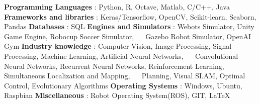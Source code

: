 \begin{cventries}  
\skillentry
    {
    \bullet \space \textbf{Programming Languages} : Python, R, Octave, Matlab, C/C++, Java \newline
    \bullet \space \textbf{Frameworks and libraries} : Keras/Tensorflow, OpenCV, Scikit-learn, Seaborn, Pandas   \newline
    \bullet \space \textbf{Databases} : SQL
    \bullet \space \textbf{Engines and Simulators} : Webots Simulator, Unity Game Engine, Robocup Soccer Simulator, \newline $\quad$ Gazebo Robot Simulator, OpenAI Gym \newline
    \bullet \space \textbf{Industry knowledge} : Computer Vision, Image Processing, Signal Processing, Machine Learning, Artificial Neural Networks, \newline $\quad$ Convolutional Neural Networks, Recurrent Neural Networks, Reinforcement Learning, Simultaneous Localization and Mapping, \newline $\quad$ Planning, Visual SLAM, Optimal Control, Evolutionary Algorithms   \newline
    \bullet \space \textbf{Operating Systems} : Windows, Ubuntu, Raspbian \newline
    \bullet \space \textbf{Miscellaneous} : Robot Operating System(ROS), GIT, LaTeX
    }
\end{cventries}
